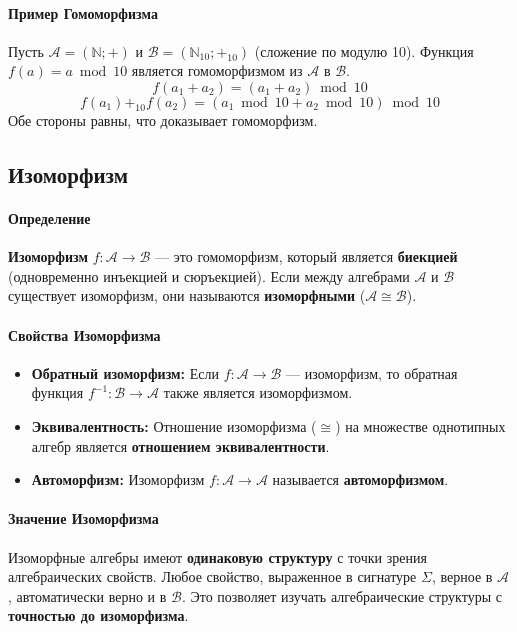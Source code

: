 \paragraph{Пример Гомоморфизма}
Пусть $\mathcal{A} = (\mathbb{N}; +)$ и $\mathcal{B} = (\mathbb{N}_{10}; +_{10})$ (сложение по модулю 10).
Функция $f(a) = a \bmod 10$ является гомоморфизмом из $\mathcal{A}$ в $\mathcal{B}$.
$$f(a_1 + a_2) = (a_1 + a_2) \bmod 10$$
$$f(a_1) +_{10} f(a_2) = (a_1 \bmod 10 + a_2 \bmod 10) \bmod 10$$
Обе стороны равны, что доказывает гомоморфизм.

\subsection*{Изоморфизм}

\paragraph{Определение}
\textbf{Изоморфизм} $f: \mathcal{A} \to \mathcal{B}$ --- это гомоморфизм, который является \textbf{биекцией} (одновременно инъекцией и сюръекцией).
Если между алгебрами $\mathcal{A}$ и $\mathcal{B}$ существует изоморфизм, они называются \textbf{изоморфными} ($\mathcal{A} \cong \mathcal{B}$).

\paragraph{Свойства Изоморфизма}
\begin{itemize}
    \item \textbf{Обратный изоморфизм:} Если $f: \mathcal{A} \to \mathcal{B}$ --- изоморфизм, то обратная функция $f^{-1}: \mathcal{B} \to \mathcal{A}$ также является изоморфизмом.
    \item \textbf{Эквивалентность:} Отношение изоморфизма ($\cong$) на множестве однотипных алгебр является \textbf{отношением эквивалентности}.
    \item \textbf{Автоморфизм:} Изоморфизм $f: \mathcal{A} \to \mathcal{A}$ называется \textbf{автоморфизмом}.
\end{itemize}

\paragraph{Значение Изоморфизма}
Изоморфные алгебры имеют \textbf{одинаковую структуру} с точки зрения алгебраических свойств. Любое свойство, выраженное в сигнатуре $\Sigma$, верное в $\mathcal{A}$, автоматически верно и в $\mathcal{B}$. Это позволяет изучать алгебраические структуры с \textbf{точностью до изоморфизма}.

